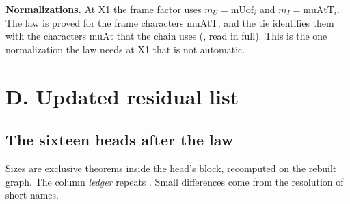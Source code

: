 \documentclass[11pt]{article}
\theoremstyle{definition}
\theoremstyle{remark}
\begin{document}
\noindent\textbf{Normalizations.} At X1 the frame factor uses $m_U=\mathrm{mUof}_i$ and $m_I=\mathrm{muAtT}_i$. The law is proved for the frame characters $\mathrm{muAtT}$, and the tie  identifies them with the characters $\mathrm{muAt}$ that the chain uses (, read in full). This is the one normalization the law needs at X1 that is not automatic.

\section{D. Updated residual list}\label{sec:D}

\subsection{The sixteen heads after the law}

Sizes are exclusive theorems inside the head's block, recomputed on the rebuilt graph. The column \emph{ledger} repeats . Small differences come from the resolution of short names.
\end{document}

